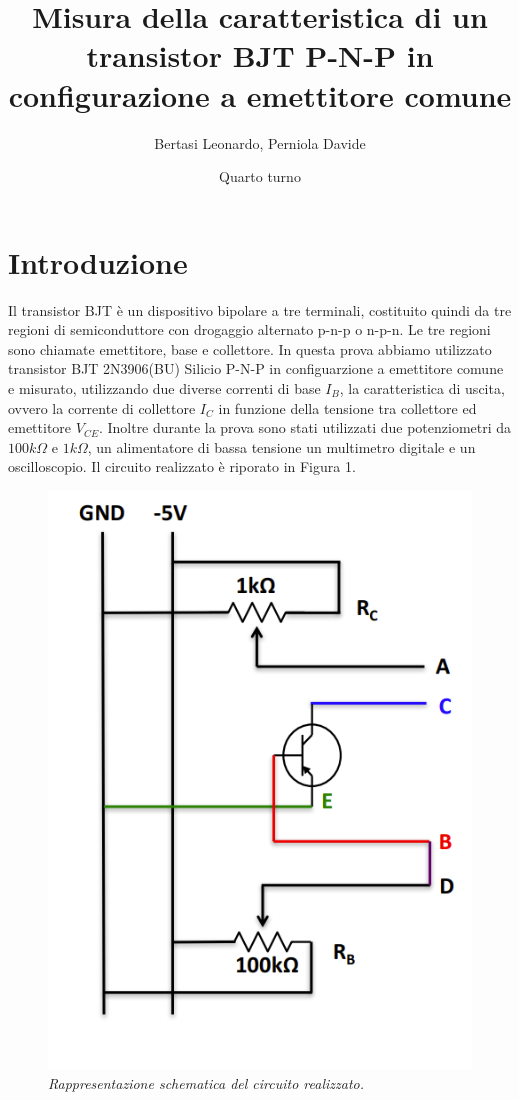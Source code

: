 \documentclass{article}
\title{Misura della caratteristica di un transistor BJT P-N-P in configurazione a emettitore comune}
\date{Quarto turno}
\author{Bertasi Leonardo, Perniola Davide }
\begin{document}
\maketitle
\section{Introduzione} 
Il transistor BJT è un dispositivo bipolare a tre terminali, costituito quindi da tre regioni di semiconduttore con drogaggio alternato
p-n-p o n-p-n. Le tre regioni sono chiamate emettitore, base e collettore. In questa prova abbiamo utilizzato transistor BJT 2N3906(BU) Silicio P-N-P in configuarzione a emettitore comune
e misurato, utilizzando due diverse correnti di base $I_B$, la caratteristica di uscita, ovvero la corrente di collettore $I_C$ in funzione della tensione tra collettore ed emettitore $V_{CE}$.
Inoltre durante la prova sono stati utilizzati due potenziometri da $100k\Omega$ e $1k\Omega$, un alimentatore di bassa tensione un multimetro digitale e un oscilloscopio.
Il circuito realizzato è riporato in Figura 1.



\begin{figure}[]
  \centering
  \includegraphics[scale=0.55]{Transis.png}
  \qquad
  \caption{\textit{Rappresentazione schematica del circuito realizzato. }}
\end{figure}
\end{document}
